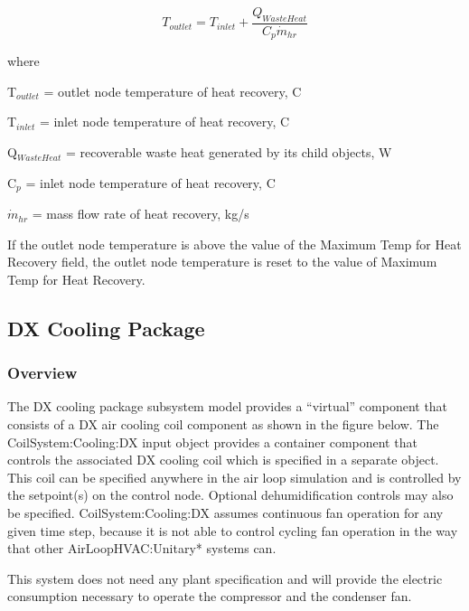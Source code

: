 \begin{equation}
{T_{outlet}} = {T_{inlet}} + \frac{{{Q_{WasteHeat}}}}{{{C_p}{{\dot m}_{hr}}}}
\end{equation}

where

T\(_{outlet}\) = outlet node temperature of heat recovery, C

T\(_{inlet}\) = inlet node temperature of heat recovery, C

Q\(_{WasteHeat}\) = recoverable waste heat generated by its child objects, W

C\(_{p}\) = inlet node temperature of heat recovery, C

\({{{\dot m}_{hr}}}\) = mass flow rate of heat recovery, kg/s

If the outlet node temperature is above the value of the Maximum Temp for Heat Recovery field, the outlet node temperature is reset to the value of Maximum Temp for Heat Recovery.

\subsection{DX Cooling Package}\label{dx-cooling-package}

\subsubsection{Overview}\label{overview-5}

The DX cooling package subsystem model provides a ``virtual'' component that consists of a DX air cooling coil component as shown in the figure below. The CoilSystem:Cooling:DX input object provides a container component that controls the associated DX cooling coil which is specified in a separate object. This coil can be specified anywhere in the air loop simulation and is controlled by the setpoint(s) on the control node. Optional dehumidification controls may also be specified. CoilSystem:Cooling:DX assumes continuous fan operation for any given time step, because it is not able to control cycling fan operation in the way that other AirLoopHVAC:Unitary* systems can.

This system does not need any plant specification and will provide the electric consumption necessary to operate the compressor and the condenser fan.

